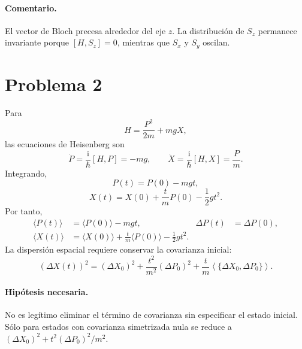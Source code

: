 \documentclass[11pt,a4paper]{article}
\numberwithin{equation}{section}
\renewcommand{\boxed}[1]{#1}
\newcommand{\ii}{\mathrm i}
\newcommand{\hb}{\hbar}
\begin{document}
\paragraph{Comentario.}
El vector de Bloch precesa alrededor del eje $z$. La distribución de $S_z$ permanece invariante porque $[H,S_z]=0$, mientras que $S_x$ y $S_y$ oscilan.


\section{Problema 2}
Para
\begin{equation}
H=\frac{P^2}{2m}+mgX,
\end{equation}
las ecuaciones de Heisenberg son
\begin{equation}
\dot P=\frac{\ii}{\hb}[H,P]=-mg,
\qquad
\dot X=\frac{\ii}{\hb}[H,X]=\frac Pm.
\end{equation}
Integrando,
\begin{equation}
\boxed{P(t)=P(0)-mgt,}
\end{equation}
\begin{equation}
\boxed{X(t)=X(0)+\frac{t}{m}P(0)-\frac12gt^2.}
\end{equation}
Por tanto,
\begin{align}
\langle P(t)\rangle&=\langle P(0)\rangle-mgt,&
\Delta P(t)&=\Delta P(0),\\
\langle X(t)\rangle&=\langle X(0)\rangle+\frac tm\langle P(0)\rangle-\frac12gt^2.
\end{align}
La dispersión espacial requiere conservar la covarianza inicial:
\begin{equation}
\boxed{
(\Delta X(t))^2=(\Delta X_0)^2+\frac{t^2}{m^2}(\Delta P_0)^2
+\frac{t}{m}\left\langle\{\Delta X_0,\Delta P_0\}\right\rangle.}
\end{equation}

\paragraph{Hipótesis necesaria.}
No es legítimo eliminar el término de covarianza sin especificar el estado inicial. Sólo para estados con covarianza simetrizada nula se reduce a $(\Delta X_0)^2+t^2(\Delta P_0)^2/m^2$.
\end{document}
